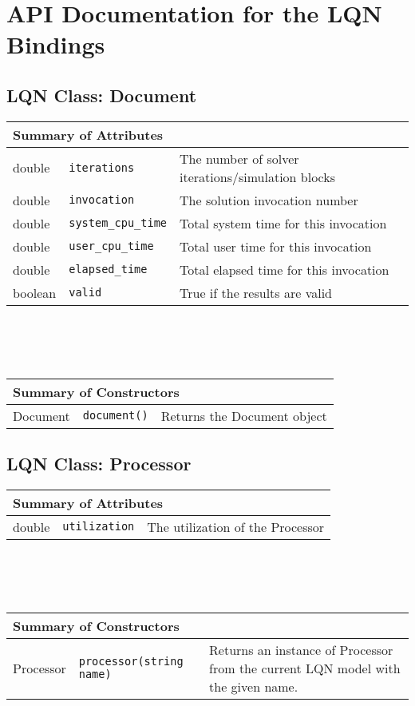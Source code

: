 
\section{API Documentation for the LQN Bindings}

\subsection{LQN Class: Document}
\begin{tabular}{|p{1.0in}|p{2.3in}||p{2.8in}|}
  \hline
  \multicolumn{3}{|l|}{\textbf{Summary of Attributes}}\\
  \hline
  double & {\tt iterations} & The number of solver iterations/simulation blocks\\
  double & {\tt invocation} & The solution invocation number\\
  double & {\tt system\_cpu\_time} & Total system time for this invocation\\
  double & {\tt user\_cpu\_time} & Total user time for this invocation\\
  double & {\tt elapsed\_time} & Total elapsed time for this invocation\\
  boolean & {\tt valid} & True if the results are valid\\
  \hline
\end{tabular}
\\\\\ \\
\begin{tabular}{|p{1.0in}|p{2.3in}||p{2.8in}|}
  \hline
  \multicolumn{3}{|l|}{\textbf{Summary of Constructors}}\\
  \hline
  Document & {\tt document()} & Returns the Document object\\
  \hline
\end{tabular}

\subsection{LQN Class: Processor}
\begin{tabular}{|p{1.0in}|p{2.3in}||p{2.8in}|}
  \hline
  \multicolumn{3}{|l|}{\textbf{Summary of Attributes}}\\
  \hline
  double & {\tt utilization} & The utilization of the Processor\\
  \hline
\end{tabular}
\\\\\ \\
\begin{tabular}{|p{1.0in}|p{2.3in}||p{2.8in}|}
  \hline
  \multicolumn{3}{|l|}{\textbf{Summary of Constructors}}\\
  \hline
  Processor & {\tt processor(string name)} & Returns an instance of Processor from the current LQN model with the given name.\\
  \hline
\end{tabular}

